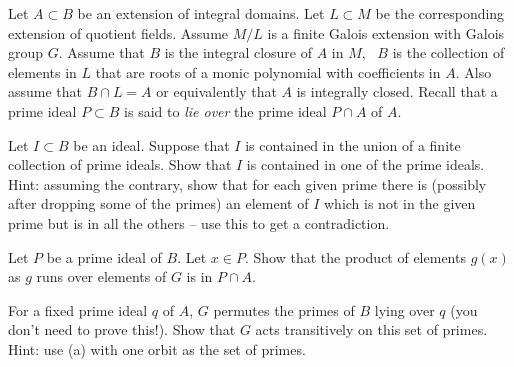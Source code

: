 Let $A\subset B$ be an extension of integral domains. Let $L\subset M$
be the corresponding extension of quotient fields. Assume $M/L$ is a
finite Galois extension with Galois group $G$. Assume that $B$ is the
integral closure of $A$ in $M$, \ie\ $B$ is the collection of elements
in $L$ that are roots of a monic polynomial with coefficients in
$A$. Also assume that $B\cap L=A$ or equivalently that $A$ is
integrally closed. Recall that a prime ideal $P\subset B$ is said to
\emph{lie over} the prime ideal $P\cap A$ of $A$.
\begin{alist}
\item Let $I\subset B$ be an ideal. Suppose that $I$ is contained in
the union of a finite collection of prime ideals. Show that $I$ is
contained in one of the prime ideals. Hint: assuming the contrary,
show that for each given prime there is (possibly after dropping some
of the primes) an element of $I$ which is not in the given prime but
is in all the others -- use this to get a contradiction.
\item Let $P$ be a prime ideal of $B$. Let $x\in P$. Show that the
product of elements $g(x)$ as $g$ runs over elements of $G$ is in
$P\cap A$.
\item For a fixed prime ideal $q$ of $A$, $G$ permutes the primes of
$B$ lying over $q$ (you don't need to prove this!). Show that $G$ acts
transitively on this set of primes. Hint: use (a) with one orbit as
the set of primes.
\end{alist}
